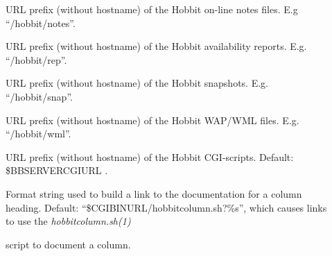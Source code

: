\begin{description}
 

\item[] URL prefix (without hostname) of the Hobbit on-line notes files. E.g ``/hobbit/notes''. 

 

\item[] URL prefix (without hostname) of the Hobbit availability reports. E.g. ``/hobbit/rep''. 

 

\item[] URL prefix (without hostname) of the Hobbit snapshots. E.g. ``/hobbit/snap''. 

 

\item[] URL prefix (without hostname) of the Hobbit WAP/WML files. E.g. ``/hobbit/wml''. 

 

\item[] URL prefix (without hostname) of the Hobbit CGI-scripts. Default: \$BBSERVERCGIURL . 

 

\item[] Format string used to build a link to the
  documentation for a column heading. Default:
  ``\$CGIBINURL/hobbitcolumn.sh?\%s'', which causes links to use the
  \emph{hobbitcolumn.sh(1)}

 script to document a column. 

 


 


\end{description}
